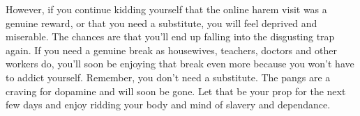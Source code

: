 However, if you continue kidding yourself that the online harem visit was a genuine reward, or that you need a substitute, you will feel deprived and miserable. The chances are that you'll end up falling into the disgusting trap again. If you need a genuine break as housewives, teachers, doctors and other workers do, you'll soon be enjoying that break even more because you won't have to addict yourself. Remember, you don't need a substitute. The pangs are a craving for dopamine and will soon be gone. Let that be your prop for the next few days and enjoy ridding your body and mind of slavery and dependance.
